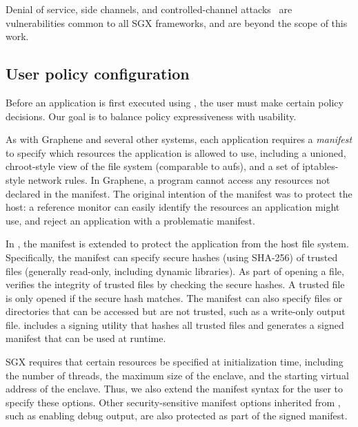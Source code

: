 
Denial of service, side channels, and controlled-channel attacks~\cite{xu15controlledchannel}
are vulnerabilities common to all SGX frameworks, and 
are beyond the scope of this work.

\subsection{User policy configuration}

Before an application is first executed using \graphenesgx{}, 
the user must make certain policy decisions.  
Our goal is to balance policy expressiveness
with usability.

As with Graphene and several other systems, each application requires a {\em manifest}
to specify which resources the application is allowed to use, including
a unioned, chroot-style view of the file system (comparable to aufs),
and a set of iptables-style network rules.
In Graphene, a program cannot access any resources not declared in the manifest.
The original intention of the manifest was to protect the host: a reference monitor 
can easily identify the resources an application might use, and reject an application
with a problematic manifest.

In \graphenesgx{}, the manifest is extended to protect the application from the host file system.
Specifically, the manifest can specify secure hashes (using SHA-256) of trusted files (generally read-only, including dynamic libraries). As part of opening a file,
\graphenesgx{} verifies the integrity of trusted files by checking the secure hashes.  A trusted file is only opened if the secure hash matches.
The manifest can also specify files or directories that can be accessed 
but are not trusted, such as a write-only output file.
\graphenesgx{} includes a signing utility that hashes all trusted files and 
generates a signed manifest that can be used at runtime.

SGX requires that certain resources be specified at initialization time, including the number of threads,
the maximum size of the enclave, and the starting virtual address of the enclave.  Thus, we also extend the manifest syntax for the 
user to specify these options.
Other security-sensitive manifest options inherited from \graphene{}, such as enabling debug output, are also protected as part of the signed manifest.



